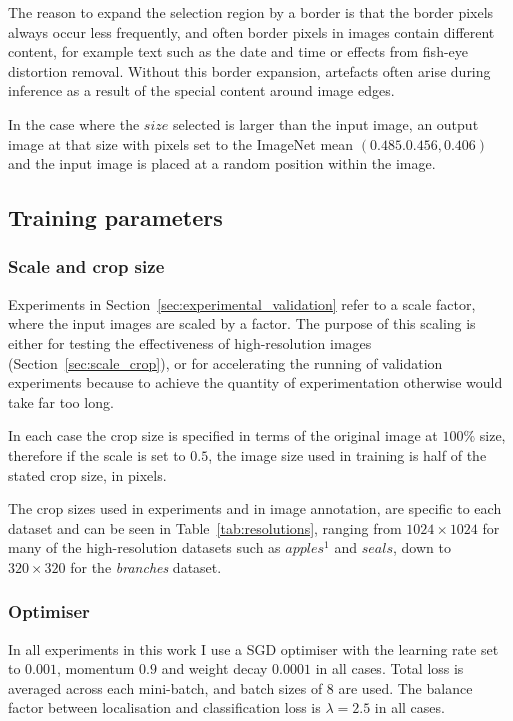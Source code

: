 The reason to expand the selection region by a border is that the border pixels always occur less frequently, and often border pixels in images contain different content, for example text such as the date and time or effects from fish-eye distortion removal. Without this border expansion, artefacts often arise during inference as a result of the special content around image edges. 

In the case where the $size$ selected is larger than the input image, an output image at that size with pixels set to the ImageNet mean $ (0.485. 0.456, 0.406) $ and the input image is placed at a random position within the image.


\subsection {Training parameters}
\label{sec:parameters}

\subsubsection{Scale and crop size}

Experiments in Section~\ref{sec:experimental_validation} refer to a scale factor, where the input images are scaled by a factor. The purpose of this scaling is either for testing the effectiveness of high-resolution images (Section~\ref{sec:scale_crop}), or for accelerating the running of validation experiments because to achieve the quantity of experimentation otherwise would take far too long.

In each case the crop size is specified in terms of the original image at $100\%$ size, therefore if the scale is set to $0.5$, the image size used in training is half of the stated crop size, in pixels.

The crop sizes used in experiments and in image annotation, are specific to each dataset and can be seen in Table~\ref{tab:resolutions}, ranging from $1024\times1024$ for many of the high-resolution datasets such as $apples^1$ and $seals$, down to $320\times320$ for the \emph{branches} dataset.

\subsubsection{Optimiser}

In all experiments in this work I use a \gls{SGD} optimiser with the learning rate set to $0.001$, momentum $0.9$ and weight decay $0.0001$ in all cases. Total loss is averaged across each mini-batch, and batch sizes of $8$ are used. The balance factor between localisation and classification loss is $\lambda=2.5$ in all cases.

